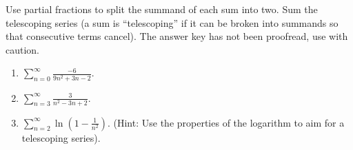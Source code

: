 Use partial fractions to split the summand of each sum into two. Sum the telescoping series (a sum is ``telescoping'' if it can be broken into summands so that consecutive terms cancel). The answer key has not been proofread, use with caution.
\begin{enumerate}[ref={\fcProblemRef}]
\item $\displaystyle \sum\limits_{n=0}^{\infty} \frac{-6}{9 n^{2}+3 n-2}$\quad.
\item \label{probelmSum_n=3^infty 3/(n^2-3n+2) }  $\displaystyle \sum \limits_{n=3}^{\infty} \frac{3}{n^{2}-3 n+2} $\quad.

\item \label{problemsumn=2^inftyln(1-1/n^2)} $\displaystyle\sum_{n=2}^{\infty} \ln \left(1-\frac{1}{n^2}\right).$ (Hint: Use the properties of the logarithm to aim for a telescoping series).


\end{enumerate}